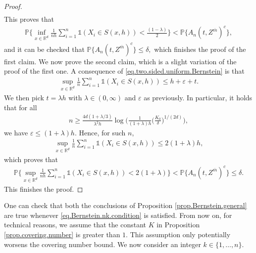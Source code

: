 \documentclass[10pt]{article}
\newcommand{\eps}{\varepsilon}
\newcommand{\PP}{\mathbb{P}}
\newcommand{\RR}{\mathbb{R}}
\newcommand{\ol}{\overline}
\begin{document}
\begin{proof}
\begin{align*}
    \end{align*}
    This proves that
    \begin{align*}
        \PP\Bigg\{\inf_{x \in \RR^d}\frac 1{nh} \sum_{i=1}^n \mathds{1}(X_i \in S(x, h)) < \frac{(1 - \lambda)}2\Bigg\} < \PP\big\{A_n(t, Z^{\ol m})^c\big\},
    \end{align*}
    and it can be checked that $\PP\big\{A_n(t, Z^{\ol m})^c\big\} \leq \delta,$ which finishes the proof of the first claim. We now prove the second claim, which is a slight variation of the proof of the first one. A consequence of \eqref{eq.two.sided.uniform.Bernstein} is that
    \begin{align*}
        \sup_{x \in \RR^d}\frac 1n \sum_{i=1}^n \mathds{1}(X_i \in S(x, h)) \leq h + \eps + t.
    \end{align*}
    We then pick $t = \lambda h$ with $\lambda \in (0, \infty)$ and $\eps$ as previously. In particular, it holds that for all 
    \begin{align*}
        n \geq \frac{4d(1 + \lambda/3)}{\lambda^2h}\log\Bigg(\frac{1}{(1 + \lambda) h}\bigg(\frac{K_0}{\delta}\bigg)^{1/(2d)}\Bigg),
    \end{align*}
    we have $\eps \leq (1 + \lambda)h.$ Hence, for such $n$,
    \begin{align*}
        \sup_{x \in \RR^d}\frac 1n \sum_{i=1}^n \mathds{1}(X_i \in S(x, h)) \leq 2(1 + \lambda)h,
    \end{align*}
    which proves that
    \begin{align*}
        \PP\Bigg\{\sup_{x \in \RR^d}\frac 1{nh} \sum_{i=1}^n \mathds{1}(X_i \in S(x, h)) < 2(1 + \lambda)\Bigg\} < \PP\big\{A_n(t, Z^{\ol m})^c\big\} \leq \delta.
    \end{align*}
    This finishes the proof.
\end{proof}

One can check that both the conclusions of Proposition \ref{prop.Bernstein.general} are true whenever \eqref{eq.Bernstein.nk.condition} is satisfied. From now on, for technical reasons, we assume that the constant $K$ in Proposition \ref{prop.covering.number} is greater than $1.$ This assumption only potentially worsens the covering number bound. We now consider an integer $k \in \{1, \dots, n\}.$
\end{document}
